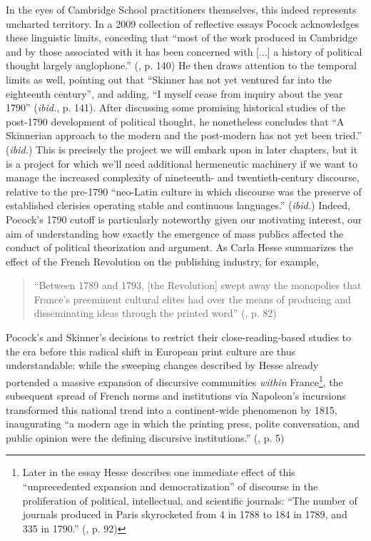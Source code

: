 \documentclass[11pt]{article}
\begin{document}
In the eyes of Cambridge School practitioners themselves, this indeed represents uncharted territory. In a 2009 collection of reflective essays Pocock acknowledges these linguistic limits, conceding that ``most of the work produced in Cambridge and by those associated with it has been concerned with [...] a history of political thought largely anglophone.'' (\cite{pocock_political_2009}, p. 140) He then draws attention to the temporal limits as well, pointing out that ``Skinner has not yet ventured far into the eighteenth century'', and adding, ``I myself cease from inquiry about the year 1790'' (\textit{ibid.}, p. 141). After discussing some promising historical studies of the post-1790 development of political thought, he nonetheless concludes that ``A Skinnerian approach to the modern and the post-modern has not yet been tried.'' (\textit{ibid.}) This is precisely the project we will embark upon in later chapters, but it is a project for which we'll need additional hermeneutic machinery if we want to manage the increased complexity of nineteenth- and twentieth-century discourse, relative to the pre-1790 ``neo-Latin culture in which discourse was the preserve of established clerisies operating stable and continuous languages.'' (\textit{ibid.}) Indeed, Pocock's 1790 cutoff is particularly noteworthy given our motivating interest, our aim of understanding how exactly the emergence of mass publics affected the conduct of political theorization and argument. As Carla Hesse summarizes the effect of the French Revolution on the publishing industry, for example,
\begin{quote}
``Between 1789 and 1793, [the Revolution] swept away the monopolies that France's preeminent cultural elites had over the means of producing and disseminating ideas through the printed word'' (\cite{darnton_revolution_1989}, p. 82)
\end{quote}
Pocock's and Skinner's decisions to restrict their close-reading-based studies to the era before this radical shift in European print culture are thus understandable: while the sweeping changes described by Hesse already portended a massive expansion of discursive communities \textit{within} France\footnote{Later in the essay Hesse describes one immediate effect of this ``unprecedented expansion and democratization'' of discourse in the proliferation of political, intellectual, and scientific journals: ``The number of journals produced in Paris skyrocketed from 4 in 1788 to 184 in 1789, and 335 in 1790.'' (\cite{darnton_revolution_1989}, p. 92)}, the subsequent spread of French norms and institutions via Napoleon's incursions transformed this national trend into a continent-wide phenomenon by 1815, inaugurating ``a modern age in which the printing press, polite conversation, and public opinion were the defining discursive institutions.'' (\cite{goodman_republic_1996}, p. 5)
\end{document}
